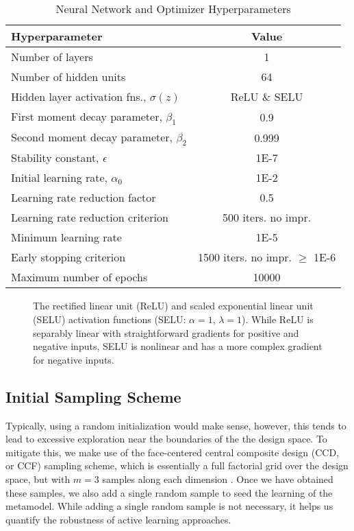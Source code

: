 \documentclass[conference]{IEEEtran}
\begin{document}
	\begin{table}[htbp]
    \renewcommand{\arraystretch}{1.0}
    \centering
    \caption{Neural Network and Optimizer Hyperparameters}
    \label{tab:nn_hyperparams}
        \begin{tabular}{lc}
        \toprule 
        \bfseries Hyperparameter & \bfseries Value \\ \midrule
	    Number of layers & 1 \\
	    Number of hidden units & 64 \\ 
	    Hidden layer activation fns., $\sigma(z)$ & ReLU \& SELU \\
	    First moment decay parameter, $\beta_1$ & 0.9 \\
	    Second moment decay parameter, $\beta_2$ & 0.999 \\
	    Stability constant, $\epsilon$ & 1E-7 \\ 
	    Initial learning rate, $\alpha_0$ & 1E-2 \\ 
	    Learning rate reduction factor & 0.5 \\
	    Learning rate reduction criterion & 500 iters. no impr. \\
	    Minimum learning rate & 1E-5 \\
	    Early stopping criterion & 1500 iters. no impr. $\ge$ 1E-6 \\ 
	    Maximum number of epochs & 10000 \\ \bottomrule
	    \end{tabular}
	\end{table}
	
	\begin{figure}[htbp]
	    \centering
	    \vspace*{-1em}
	    
	    \vspace*{-2em}
	    \caption{The rectified linear unit (ReLU) and scaled exponential linear unit (SELU) activation functions (SELU: $\alpha = 1$, $\lambda =1$). While ReLU is separably linear with straightforward gradients for positive and negative inputs, SELU is nonlinear and has a more complex gradient for negative inputs.}
	    \label{fig:activ_fns}
	\end{figure}
	
	\subsection{Initial Sampling Scheme}
	
	Typically, using a random initialization would make sense, however, this tends to lead to excessive exploration near the boundaries of the the design space. To mitigate this, we make use of the face-centered central composite design (CCD, or CCF) sampling scheme, which is essentially a full factorial grid over the design space, but with $m=3$ samples along each dimension \cite{CentralCCD}. Once we have obtained these samples, we also add a single random sample to seed the learning of the metamodel. While adding a single random sample is not necessary, it helps us quantify the robustness of active learning approaches.
	
\end{document}
